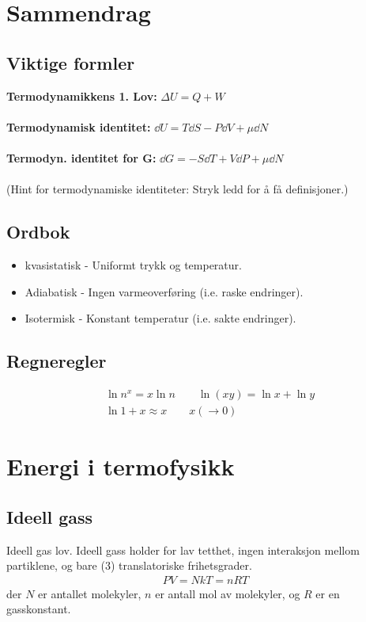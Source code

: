 \documentclass[10pt,a4paper]{article}
\renewcommand{\b}{\textbf}
\begin{document}
\begin{multicols}{2}


\section*{Sammendrag}
\subsection*{Viktige formler}
\begin{framed}
\b{Termodynamikkens 1. Lov:} $\Delta U = Q + W$ \\ \\
\b{Termodynamisk identitet:} $\dd U = T\dd S - P\dd V + \mu \dd N$
\\ \\
\b{Termodyn. identitet for G:} $\dd G = -S \dd T + V\dd P + \mu \dd N$
\\ \\
(Hint for termodynamiske identiteter: Stryk ledd for å få definisjoner.)
\end{framed}
\subsection*{Ordbok}
\begin{itemize}
	\item kvasistatisk - Uniformt trykk og temperatur. 
	\item Adiabatisk - Ingen varmeoverføring (i.e. raske endringer).
	\item Isotermisk - Konstant temperatur (i.e. sakte endringer).
\end{itemize}

\subsection*{Regneregler}
\begin{align*}
	&\ln{n^x} = x\ln{n} \quad\quad \ln(xy) = \ln{x}+\ln{y} \\
	&\ln{1+x} \approx x \quad\quad x (\rightarrow 0)
\end{align*}


\section{Energi i termofysikk}
\subsection*{Ideell gass}
\begin{framed}
Ideell gas lov. Ideell gass holder for lav tetthet, ingen interaksjon mellom partiklene, og bare (3) translatoriske frihetsgrader.
\begin{align*}
	PV = NkT = nRT
\end{align*}
der $N$ er antallet molekyler, $n$ er antall mol av molekyler, og $R$ er en gasskonstant.
\end{framed}


\end{multicols}
\end{document}
